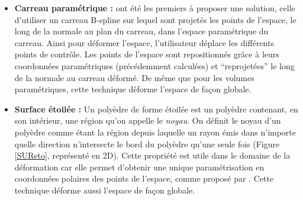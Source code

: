 \begin{itemize}
\item{\textbf{Carreau paramétrique :}} \cite{JLQ96} ont été les
  premiers à proposer une solution, celle d'utiliser un carreau
  B-spline sur lequel sont projetés les points de l'espace, le long de
  la normale au plan du carreau, dans l'espace paramétrique du
  carreau. Ainsi pour déformer l'espace, l'utilisateur déplace les
  différents points de contrôle. Les points de l'espace sont
  repositionnés grâce à leurs coordonnées paramétriques (précédemment
  calculées) et ``reprojetées'' le long de la normale au carreau
  déformé. De même que pour les volumes paramétriques, cette technique
  déforme l'espace de façon globale.
\item{\textbf{Surface étoilée :}} Un polyèdre de forme étoilée est un
  polyèdre contenant, en son intérieur, une région qu'on appelle le
  \textit{noyau}. On définit le noyau d'un polyèdre comme étant la
  région depuis laquelle un rayon émis dans n'importe quelle direction
  n'intersecte le bord du polyèdre qu'une seule fois (Figure
  \ref{SUReto}, représenté en 2D). Cette propriété est utile dans le
  domaine de la déformation car elle permet d'obtenir une unique
  paramétrisation en coordonnées polaires des points de l'espace,
  comme proposé par \cite{JL00}. Cette technique déforme aussi
  l'espace de façon globale.


\end{itemize}
